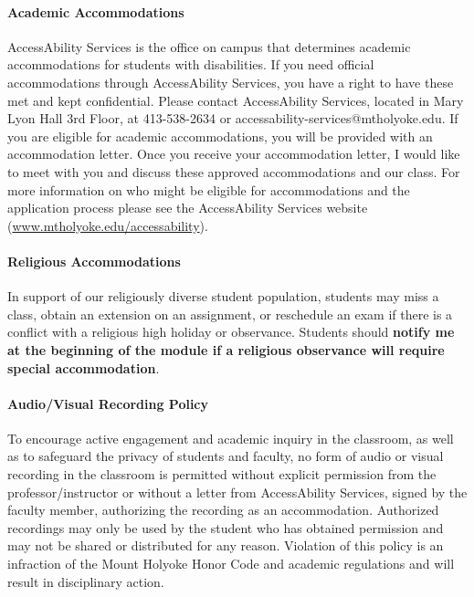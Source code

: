 \documentclass[11pt]{article}
\begin{document}
\paragraph{Academic Accommodations} AccessAbility Services is the office on campus that determines academic accommodations for students with disabilities. If you need official accommodations through AccessAbility Services, you have a right to have these met and kept confidential. Please contact AccessAbility Services, located in Mary Lyon Hall 3rd Floor, at 413-538-2634 or accessability-services@mtholyoke.edu. If you are eligible for academic accommodations, you will be provided with an accommodation letter. Once you receive your accommodation letter, I would like to meet with you and discuss these approved accommodations and our class. For more information on who might be eligible for accommodations and the application process please see the AccessAbility Services website (\url{www.mtholyoke.edu/accessability}).

\paragraph{Religious Accommodations} In support of our religiously diverse student population, students may miss a class, obtain an extension on an assignment, or reschedule an exam if there is a conflict with a religious high holiday or observance. Students should \textbf{notify me at the beginning of the module if a religious observance will require special accommodation}. 

\paragraph{Audio/Visual Recording Policy} To encourage active engagement and academic inquiry in the classroom, as well as to safeguard the privacy of students and faculty, no form of audio or visual recording in the classroom is permitted without explicit permission from the professor/instructor or without a letter from AccessAbility Services, signed by the faculty member, authorizing the recording as an accommodation. Authorized recordings may only be used by the student who has obtained permission and may not be shared or distributed for any reason. Violation of this policy is an infraction of the Mount Holyoke Honor Code and academic regulations and will result in disciplinary action.
\end{document}
